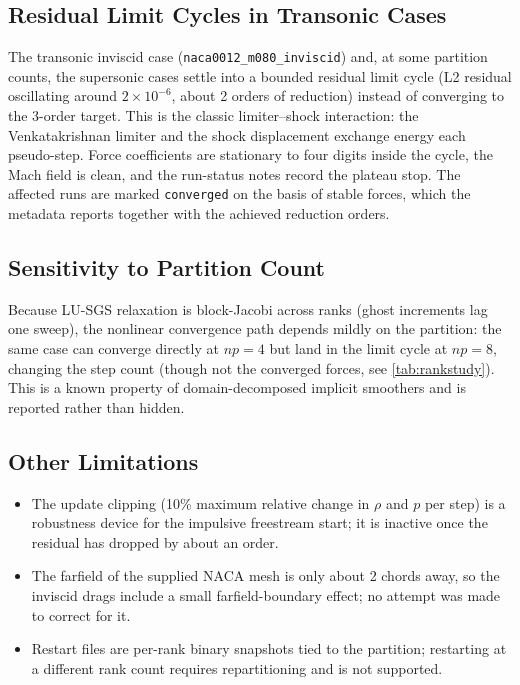 \subsection{Residual Limit Cycles in Transonic Cases}
The transonic inviscid case (\texttt{naca0012\_m080\_inviscid}) and, at some
partition counts, the supersonic cases settle into a bounded residual limit
cycle (L2 residual oscillating around $2\times10^{-6}$, about 2 orders of
reduction) instead of converging to the 3-order target. This is the classic
limiter--shock interaction: the Venkatakrishnan limiter and the shock
displacement exchange energy each pseudo-step. Force coefficients are
stationary to four digits inside the cycle, the Mach field is clean, and the
run-status notes record the plateau stop. The affected runs are marked
\texttt{converged} on the basis of stable forces, which the metadata reports
together with the achieved reduction orders.

\subsection{Sensitivity to Partition Count}
Because LU-SGS relaxation is block-Jacobi across ranks (ghost increments lag
one sweep), the nonlinear convergence path depends mildly on the partition:
the same case can converge directly at $np=4$ but land in the limit cycle at
$np=8$, changing the step count (though not the converged forces, see
\cref{tab:rankstudy}). This is a known property of domain-decomposed
implicit smoothers and is reported rather than hidden.

\subsection{Other Limitations}
\begin{itemize}
\item The update clipping (10\% maximum relative change in $\rho$ and $p$
per step) is a robustness device for the impulsive freestream start; it is
inactive once the residual has dropped by about an order.
\item The farfield of the supplied NACA mesh is only about 2 chords away,
so the inviscid drags include a small farfield-boundary effect; no attempt
was made to correct for it.
\item Restart files are per-rank binary snapshots tied to the partition;
restarting at a different rank count requires repartitioning and is not
supported.
\end{itemize}
